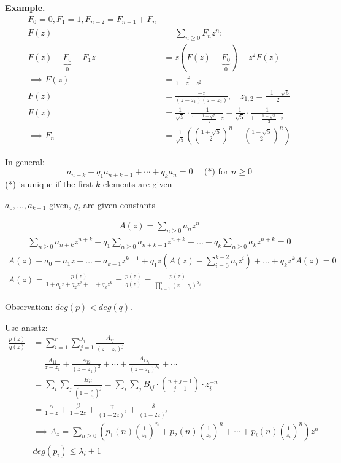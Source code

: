 \textbf{Example.}
\begin{align*}
    F_0 = 0, F_1 = 1, F_{n+2} = F_{n+1} + F_n \\
    F(z) &= \sum_{n≥0} F_n z^n : \\
    F(z) - \underbrace{F_0}_{0} - F_1 z &= z \left( F(z) - \underbrace{F_0}_{0} \right) + z^2 F(z)\\
    \implies F(z) &= \frac{z}{1-z-z^2} \\
    F(z) &= \frac{-z}{(z-z_1) (z-z_2)},
        \quad z_{1,2} = \frac{-1 \pm \sqrt{5}}{2} \\
    F(z) &= \frac1{\sqrt{5}} \cdot \frac{1}{1- \frac{1 + \sqrt{5}}{2} \cdot z} - \frac{1}{\sqrt{5}} \cdot \frac{1}{1- \frac{1 - \sqrt{5}}{2} \cdot z}  \\
    \implies F_n &= \frac{1}{\sqrt{5}}
		\left( \left( \frac{1+ \sqrt 5}{2} \right)^n
		- \left( \frac{1-\sqrt{5}}{2} \right)^n
		\right)
\end{align*}

In general:
\[
    a_{n+k} + q_1 a_{n+k-1} + \cdots + q_k a_n = 0
    \quad  \text{ (*) for }n \geq 0
\]
(*) is unique if the first $k$ elements are given

$a_0, ..., a_{k-1}$ given, $q_i$ are given constants

\begin{align*}
A(z) = \sum_{n\geq 0} a_n z^n
\end{align*}
\begin{align*}
\sum_{n\geq 0} a_{n+k} z^{n+k} + q_1 \sum_{n\geq 0}  a_{n+k-1}z^{n+k} + \ldots + q_k \sum_{n\geq 0} a_k z^{n+k} = 0
\end{align*}
\begin{align*}
A(z) - a_0 - a_1 z - \ldots - a_{k-1} z^{k-1} + q_1 z \left( A(z) - \sum_{i=0}^{k-2} a_i z^i \right) + \ldots + q_k z^k A(z) = 0\\
A(z) = \frac{ p(z) }{ 1 + q_1 z + q_2 z^2 + \ldots + q_k z^k } = \frac{p(z)}{q(z)} = \frac{p(z)}{\prod_{i=1}^{r} (z - z_i)^{\lambda_i}}
\end{align*}

Observation: $deg(p) < deg(q)$.

Use ansatz:
\begin{align*}
\frac{p(z)}{q(z)} &= \sum_{i=1}^{r} \sum_{j=1}^{\lambda_i} \frac{A_{ij}}{(z-z_i)^j} \\
&= \frac{A_{11}}{z-z_1} + \frac{A_{12}}{(z-z_1)^2} + \cdots + \frac{A_{1\lambda_i}}{(z-z_1)^{\lambda_i}} + \cdots \\
&= \sum_i\sum_j \frac{B_{ij}}{\left(1-\frac{z}{z_i}\right)^j}= \sum_i\sum_j B_{ij} \cdot \binom {n+j-1}{j-1} \cdot z_i^{-n}\\
&= \frac{\alpha}{1-z} + \frac{\beta}{1-2z} + \frac{\gamma}{(1-2z)^2} + \frac{\delta}{(1-2z)^3}\\
&\implies A_z = \sum_{n\geq 0}\left(p_1(n) \left( \frac{1}{z_1} \right)^n + p_2(n) \left( \frac{1}{z_2} \right)^n + \cdots + p_i(n) \left( \frac{1}{z_i} \right)^n \right)z^n \\
&deg(p_i) \leq \lambda_i + 1
\end{align*}

